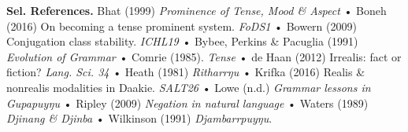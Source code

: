 \documentclass[dvipsnames,12pt]{article}%
\begin{document}
\vfill

\noindent\footnotesize\textbf{Sel. References.} Bhat (1999) \textit{Prominence of Tense, Mood \& Aspect} • Boneh (2016) On becoming a tense prominent system. \textit{FoDS1} • Bowern (2009) Conjugation class stability. \textit{ICHL19} • Bybee, Perkins \& Pacuglia (1991) \textit{Evolution of Grammar} • Comrie (1985). \textit{Tense} • de Haan (2012) Irrealis: fact or fiction? \textit{Lang. Sci. 34} • Heath (1981) \textit{Ritharrŋu} • Krifka (2016) Realis \& nonrealis modalities in Daakie. \textit{SALT26} • Lowe (n.d.) \textit{Grammar lessons in Gupapuyŋu} • Ripley (2009) \textit{Negation in natural language} • Waters (1989) \textit{Djinang \& Djinba} • Wilkinson (1991) \textit{Djambarrpuyŋu}.
\end{document}
